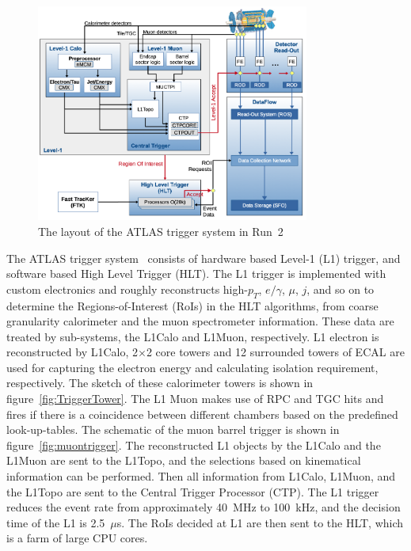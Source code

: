 \begin{figure}[tbp]
\begin{center}
 \includegraphics[width=0.8\textwidth,keepaspectratio]{figures/detector/Trigger}
\caption{
The layout of the ATLAS trigger system in Run~2
}
\label{fig:Trigger}
\end{center}
\end{figure}
The ATLAS trigger system~\cite{TRIG-2019-04} consists of hardware based Level-1 (L1) trigger, and software based High Level Trigger (HLT). 
The L1 trigger is implemented with custom electronics and roughly reconstructs high-$p_T$, $e/\gamma$, $\mu$, $j$, and so on to determine the Regions-of-Interest (RoIs) in the HLT algorithms, from coarse granularity calorimeter and the muon spectrometer information. 
These data are treated by sub-systems, the L1Calo and L1Muon, respectively. 
L1 electron is reconstructed by L1Calo, 2$\times$2 core towers and 12 surrounded towers of ECAL are used for capturing the electron energy and calculating isolation requirement, respectively. The sketch of these calorimeter towers is shown in figure~\ref{fig:TriggerTower}.
The L1 Muon makes use of RPC and TGC hits and fires if there is a coincidence between different chambers based on the predefined look-up-tables.
The schematic of the muon barrel trigger is shown in figure~\ref{fig:muontrigger}.
The reconstructed L1 objects by the L1Calo and the L1Muon are sent to the L1Topo, and the selections based on kinematical information can be performed. 
Then all information from L1Calo, L1Muon, and the L1Topo are sent to the Central Trigger Processor (CTP). 
The L1 trigger reduces the event rate from approximately 40~MHz to 100~kHz, and the decision time of the L1 is 2.5~$\mu$s.
The RoIs decided at L1 are then sent to the HLT, which is a farm of large CPU cores.
